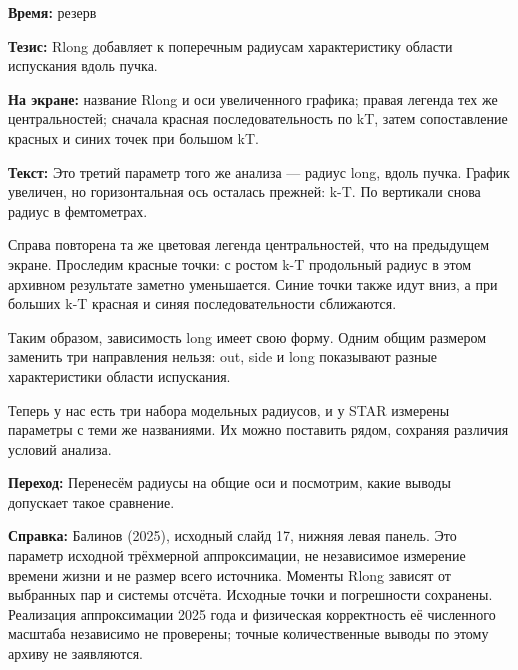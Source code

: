 \textbf{Время:} резерв

\textbf{Тезис:} Rlong добавляет к поперечным радиусам характеристику области испускания вдоль пучка.

\textbf{На экране:} название Rlong и оси увеличенного графика; правая легенда тех же центральностей; сначала красная последовательность по kT, затем сопоставление красных и синих точек при большом kT.

\textbf{Текст:} Это третий параметр того же анализа — радиус long, вдоль пучка. График увеличен, но горизонтальная ось осталась прежней: k-T. По вертикали снова радиус в фемтометрах.

Справа повторена та же цветовая легенда центральностей, что на предыдущем экране. Проследим красные точки: с ростом k-T продольный радиус в этом архивном результате заметно уменьшается. Синие точки также идут вниз, а при больших k-T красная и синяя последовательности сближаются.

Таким образом, зависимость long имеет свою форму. Одним общим размером заменить три направления нельзя: out, side и long показывают разные характеристики области испускания.

Теперь у нас есть три набора модельных радиусов, и у STAR измерены параметры с теми же названиями. Их можно поставить рядом, сохраняя различия условий анализа.

\textbf{Переход:} Перенесём радиусы на общие оси и посмотрим, какие выводы допускает такое сравнение.

\textbf{Справка:} Балинов (2025), исходный слайд 17, нижняя левая панель. Это параметр исходной трёхмерной аппроксимации, не независимое измерение времени жизни и не размер всего источника. Моменты Rlong зависят от выбранных пар и системы отсчёта. Исходные точки и погрешности сохранены. Реализация аппроксимации 2025 года и физическая корректность её численного масштаба независимо не проверены; точные количественные выводы по этому архиву не заявляются.
